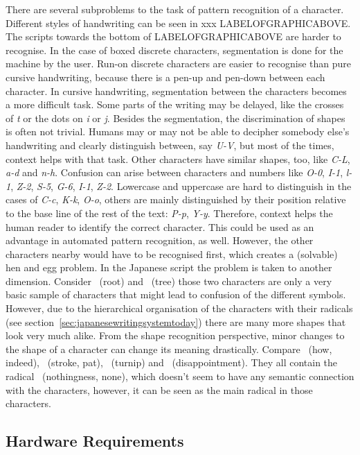 There are several subproblems to the task of pattern recognition of a character.
Different styles of handwriting can be seen in xxx LABELOFGRAPHICABOVE. 
The scripts towards the bottom of LABELOFGRAPHICABOVE are harder to recognise. 
In the case of boxed discrete characters, segmentation is done for the 
machine by the user. Run-on discrete characters are easier to recognise 
than pure cursive handwriting, because there is a pen-up and 
pen-down between each character. In cursive handwriting, segmentation 
between the characters becomes a more difficult task. Some parts of the writing
may be delayed, like the crosses of \emph{t} or the dots on \emph{i} or \emph{j}.
Besides the segmentation, the discrimination of shapes is often not trivial.
Humans may or may not be able to decipher somebody else's handwriting and clearly
distinguish between, say \emph{U-V}, but most of the times, context helps with 
that task. Other characters have similar shapes, too, like \emph{C-L}, \emph{a-d}
and \emph{n-h}. Confusion can arise between characters and numbers like 
\emph{O-0}, \emph{I-1}, \emph{l-1}, \emph{Z-2}, \emph{S-5}, \emph{G-6}, 
\emph{I-1}, \emph{Z-2}. Lowercase and uppercase are hard to distinguish in the
cases of \emph{C-c}, \emph{K-k}, \emph{O-o}, others are mainly distinguished 
by their position relative to the base line of the rest of the text: 
\emph{P-p}, \emph{Y-y}. Therefore, context helps the human reader to identify
the correct character. This could be used as an advantage in automated pattern
recognition, as well. However, the other characters nearby would have to be
recognised first, which creates a (solvable) hen and egg problem.
In the Japanese script the problem is taken to another dimension. 
Consider ~(root) and ~(tree) those two characters are only a 
very basic sample of characters that might lead to confusion of the different 
symbols. However, due to the hierarchical organisation of the characters 
with their radicals
(see section~\ref{sec:japanesewritingsystemtoday}) there are many more shapes 
that look very much alike. From the shape recognition perspective, 
minor changes to the shape of a character can change its meaning drastically.
Compare ~(how, indeed), ~(stroke, pat), ~(turnip) and
~(disappointment). They all contain the radical 
~(nothingness, none), which doesn't seem to have any semantic connection
with the characters, however, it can be seen as the main radical in those 
characters.

\subsection{Hardware Requirements}
\label{sec:hardwarerequirements}

